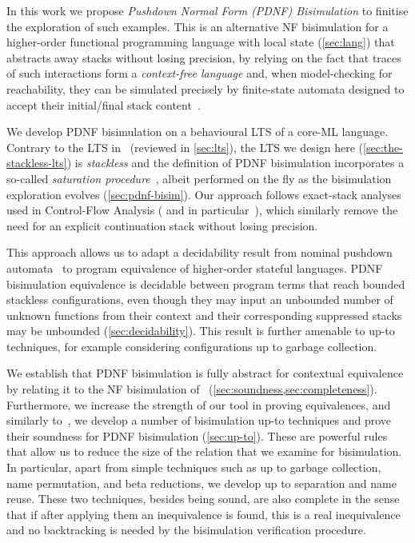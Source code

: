 In this work we propose
\emph{Pushdown Normal Form (PDNF) Bisimulation} {to finitise the exploration of such examples. This is}
an alternative NF bisimulation for a higher-order functional programming language with local state (\cref{sec:lang}) that
abstracts away stacks without losing precision, by relying on the fact that
traces of such interactions form a \emph{context-free language} and, when model-checking for reachability, they
can be simulated {precisely} by finite-state automata designed to accept their initial/final stack content~\cite{BouajjaniEM97,FinkelWW97}.

{We develop PDNF bisimulation on a behavioural LTS of a core-ML language.}
Contrary to the LTS in~\cite{KoutavasLT22} (reviewed in \cref{sec:lts}), the LTS we design here (\cref{sec:the-stackless-lts}) is \emph{stackless} and the definition of PDNF bisimulation incorporates a so-called \emph{saturation procedure}~\cite{BouajjaniEM97,FinkelWW97}, albeit performed on the fly as the bisimulation {exploration} evolves (\cref{sec:pdnf-bisim}).
Our approach follows exact-stack analyses used in Control-Flow Analysis (\cite{CFA2-jour,PDCFA,AAC} and in particular~\cite{P4F}), which similarly remove the need for an explicit continuation stack without losing precision.

This approach allows us to adapt a decidability result from nominal pushdown automata~\cite{ChengK98,MurawskiRT17} to program equivalence of higher-order stateful languages.
PDNF bisimulation equivalence is decidable between program terms that reach bounded stackless configurations, even though they may input an unbounded number of unknown functions from their context
and their corresponding {suppressed} stacks may be unbounded 
(\cref{sec:decidability}). This result is further amenable to up-to techniques, for example considering configurations up to garbage collection.

We establish that PDNF bisimulation is fully abstract for contextual equivalence by relating it to the NF bisimulation of~\cite{KoutavasLT22} (\cref{sec:soundness,sec:completeness}).
Furthermore, we increase the strength of our tool in proving equivalences, and similarly to~\cite{BiernackiLP19,KoutavasLT22},
we develop a number of bisimulation up-to techniques and prove their soundness for PDNF bisimulation (\cref{sec:up-to}).
These are powerful rules that allow us to reduce the size of the relation that we examine for bisimulation.
In particular, apart from simple techniques such as up to garbage collection, name permutation, and beta reductions, we develop up to separation and name reuse.
These two techniques, besides being sound,  are also complete in the sense that if after applying them an inequivalence is found, this is a real inequivalence and no backtracking is needed by the bisimulation verification procedure.

